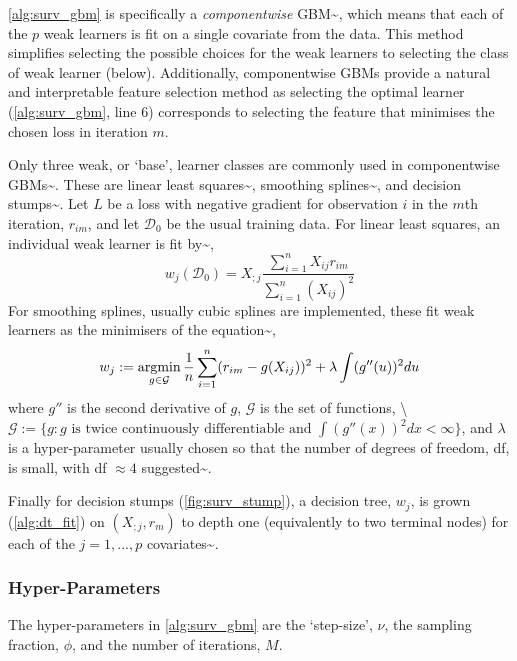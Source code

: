 \documentclass[
  letterpaper,
]{scrbook}
\theoremstyle{plain}
\theoremstyle{definition}
\theoremstyle{remark}
\begin{document}
\ref{alg:surv_gbm} is specifically a \emph{componentwise}
GBM\textasciitilde{}\cite{Buhlmann2003}, which means that each of the
\(p\) weak learners is fit on a single covariate from the data. This
method simplifies selecting the possible choices for the weak learners
to selecting the class of weak learner (below). Additionally,
componentwise GBMs provide a natural and interpretable feature selection
method as selecting the optimal learner (\ref{alg:surv_gbm}, line 6)
corresponds to selecting the feature that minimises the chosen loss in
iteration \(m\).

Only three weak, or `base', learner classes are commonly used in
componentwise GBMs\textasciitilde{}\cite{pkgmboost, Wang2010}. These are
linear least squares\textasciitilde{}\cite{Friedman2001}, smoothing
splines\textasciitilde{}\cite{Buhlmann2003}, and decision
stumps\textasciitilde{}\cite{Buhlmann2003, Friedman2001}. Let \(L\) be a
loss with negative gradient for observation \(i\) in the \(m\)th
iteration, \(r_{im}\), and let \(\mathcal{D}_0\) be the usual training
data. For linear least squares, an individual weak learner is fit
by\textasciitilde{}\cite{Friedman2001,Wang2010}, \[
w_j(\mathcal{D}_0) = X_{;j}\frac{\sum^n_{i=1} X_{ij}r_{im}}{\sum^n_{i=1} (X_{ij})^2}
\] For smoothing splines, usually cubic splines are implemented, these
fit weak learners as the minimisers of the
equation\textasciitilde{}\cite{Buhlmann2003}, \[
w_j := \operatornamewithlimits{argmin}_{g \in \mathcal{G}} \frac{1}{n} \sum^{n}_{i = 1} (r_{im} - g(X_{ij}))^2 + \lambda \int (g''(u))^2 du
\] where \(g''\) is the second derivative of \(g\), \(\mathcal{G}\) is
the set of functions, \textbackslash{}
\(\mathcal{G}:= \{g: g \text{ is twice continuously differentiable and } \int (g''(x))^2 dx < \infty\}\),
and \(\lambda\) is a hyper-parameter usually chosen so that the number
of degrees of freedom, df, is small, with df \(\approx 4\)
suggested\textasciitilde{}\cite{Buhlmann2003, Schmid2008a, Wang2010}.

Finally for decision stumps (\ref{fig:surv_stump}), a decision tree,
\(w_j\), is grown (\ref{alg:dt_fit}) on \((X_{;j}, r_m)\) to depth one
(equivalently to two terminal nodes) for each of the \(j = 1,...,p\)
covariates\textasciitilde{}\cite{Friedman2001}.

\subsubsection{Hyper-Parameters}

The hyper-parameters in \ref{alg:surv_gbm} are the `step-size', \(\nu\),
the sampling fraction, \(\phi\), and the number of iterations, \(M\).
\end{document}
